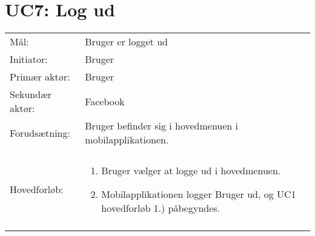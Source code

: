 \section{UC7: Log ud}
\begin{tabular}{ >{\raggedleft} p{3cm} | p{12cm} }
Mål: &  Bruger er logget ud \\
Initiator: & Bruger \\
Primær aktør: & Bruger \\
Sekundær aktør: &  Facebook\\
Forudsætning: & Bruger befinder sig i hovedmenuen i mobilapplikationen.
 \\
 & \\
Hovedforløb:  & \begin{enumerate}[label=\arabic*.),itemjoin={\newline},topsep=0pt,partopsep=0pt,itemsep=0pt,leftmargin=*]   
\item Bruger vælger at logge ud i hovedmenuen.
\item Mobilapplikationen logger Bruger ud, og UC1 hovedforløb 1.) påbegyndes.
\end{enumerate}\\
& \\
\end{tabular}



